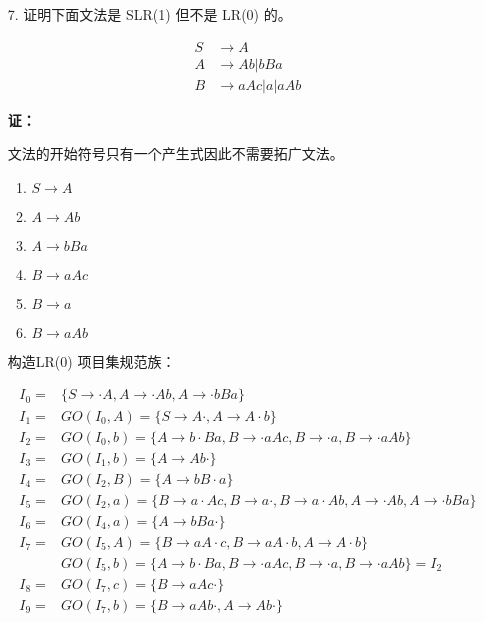 \begin{enumerate}
\begin{enumerate}
    \end{enumerate}
    
    \item[7.] 证明下面文法是 SLR(1) 但不是 LR(0) 的。
    
    \begin{align*}
        S & \to A \\
        A & \to Ab | bBa \\
        B & \to aAc | a | aAb
    \end{align*}
    
    \textbf{证：}
    
    文法的开始符号只有一个产生式因此不需要拓广文法。
    
    \begin{enumerate}[(1)]
        \item $S \to A$
        \item $A \to Ab$
        \item $A \to bBa$
        \item $B \to aAc$
        \item $B \to a$
        \item $B \to aAb$
    \end{enumerate}
    
    构造LR(0) 项目集规范族：
    
    \begin{equation*}
        \begin{array}{cl}
            I_0 = & \{S \to \cdot A, A \to \cdot Ab, A \to \cdot bBa\} \\
            \hline
            I_1 = & GO(I_0, A) = \{S \to A \cdot, A \to A \cdot b \} \\
            I_2 = & GO(I_0, b) = \{A \to b \cdot Ba, B \to \cdot aAc, B \to \cdot a, B \to \cdot aAb \}\\
            \hline
            I_3 = & GO(I_1, b) = \{A \to Ab \cdot\} \\
            \hline
            I_4 = & GO(I_2, B) = \{A \to bB \cdot a\} \\
            I_5 = & GO(I_2, a) = \{B \to a \cdot Ac, B \to a \cdot, B \to a \cdot Ab, A \to \cdot Ab, A \to \cdot bBa\} \\
            \hline
            I_6 = & GO(I_4, a) = \{A \to bBa \cdot \} \\
            \hline
            I_7 = & GO(I_5, A) = \{B \to aA \cdot c, B \to aA \cdot b, A \to A \cdot b \} \\
                  & GO(I_5, b) = \{A \to b \cdot Ba, B \to \cdot aAc, B \to \cdot a, B \to \cdot aAb \} = I_2 \\
            \hline
            I_8 = & GO(I_7, c) = \{B \to aAc \cdot\} \\
            I_9 = & GO(I_7, b) = \{B \to aAb \cdot, A \to Ab \cdot\}
        \end{array}
    \end{equation*}
    

\end{enumerate}
